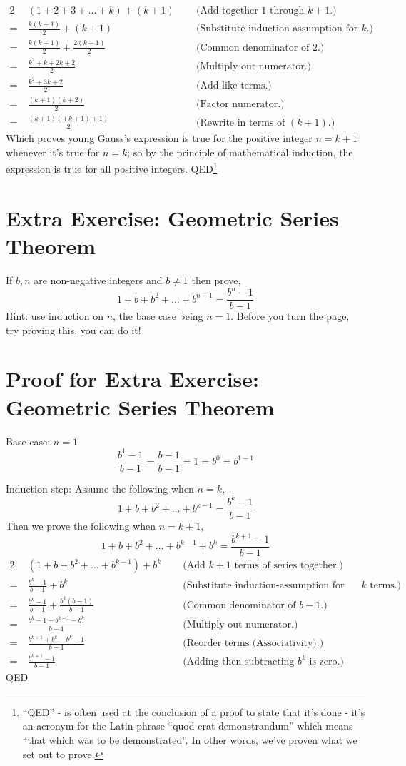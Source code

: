 \documentclass{article}
\begin{document}
\begin{alignat*}{2}
&(1+2+3+\ldots+k) + (k+1) \;\;  &&\text{(Add together 1 through }k+1\text{.)}\\
=\ &\frac{k(k+1)}{2} + (k+1) &&\text{(Substitute induction-assumption for 1 through }k\text{.)}\\
=\ &\frac{k(k+1)}{2} + \frac{2(k+1)}{2} &&\text{(Common denominator of 2.)}\\
=\ &\frac{k^2+k+2k+2}{2} &&\text{(Multiply out numerator.)}\\
=\ &\frac{k^2+3k+2}{2} &&\text{(Add like terms.)}\\
=\ &\frac{(k+1)(k+2)}{2} &&\text{(Factor numerator.)}\\
=\ &\frac{(k+1)((k+1)+1)}{2} &&\text{(Rewrite in terms of }(k+1)\text{.)}
\end{alignat*}
Which proves young Gauss's expression is true for
the positive integer $n = k+1$ whenever it's true for $n = k$; so
by the principle of mathematical induction,
the expression is true for all positive integers. QED\footnote{``QED'' - is
often used at the conclusion of a proof to state that it's
done - it's an acronym for the Latin phrase
``quod erat demonstrandum'' which means ``that which was to be demonstrated''.
In other words, we've proven what we set out to prove.}

\section*{Extra Exercise: Geometric Series Theorem}
If $b, n$ are non-negative integers and $b\ne1$ then prove,
\[1+b+b^2+\dots+b^{n-1} = \frac{b^n-1}{b-1}\]
Hint: use induction on $n$, the base case being $n=1$.  Before you turn the page, try proving this, you can do it!

\break
\section*{Proof for Extra Exercise: Geometric Series Theorem}
Base case: $n=1$
\[\frac{b^1-1}{b-1}=\frac{b-1}{b-1}=1=b^0=b^{1-1}\]

Induction step:
Assume the following when \(n = k\),
\[1+b+b^2+\dots+b^{k-1} = \frac{b^k-1}{b-1}\]
Then we prove the following when \(n = k + 1\),
\[1+b+b^2+\dots+b^{k-1}+b^k = \frac{b^{k+1}-1}{b-1}\]
\begin{alignat*}{2}
&(1+b+b^2+\dots+b^{k-1}) + b^k  \;\;  &&\text{(Add }k+1\text{ terms of series together.)}\\
=\ &\frac{b^k-1}{b-1}+b^k &&\text{(Substitute induction-assumption for first }k\text{ terms.)}\\
=\ &\frac{b^k-1}{b-1}+\frac{b^k(b-1)}{b-1}  &&\text{(Common denominator of }b-1\text{.)}\\
=\ &\frac{b^k-1+b^{k+1}-b^k}{b-1} &&\text{(Multiply out numerator.)}\\
=\ &\frac{b^{k+1}+b^k-b^k-1}{b-1} &&\text{(Reorder terms (Associativity).)}\\
=\ &\frac{b^{k+1}-1}{b-1} &&\text{(Adding then subtracting }b^k\text{ is zero.)}
\end{alignat*}
QED
\end{document}
